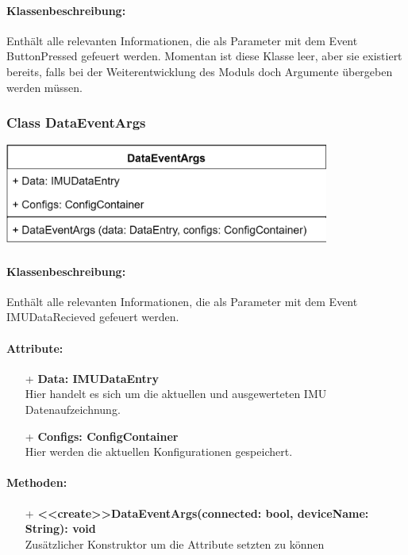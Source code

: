 \documentclass[a4paper,12pt]{article}
\begin{document}
\paragraph{Klassenbeschreibung:}
Enthält alle relevanten Informationen, die als Parameter mit dem Event ButtonPressed gefeuert werden. Momentan ist diese Klasse leer, aber sie existiert bereits, falls bei der Weiterentwicklung des Moduls doch Argumente übergeben werden müssen.



\begin{minipage}[b]{0.5\textwidth}
	\subsubsection{Class DataEventArgs}
	
	\end{minipage}
	\begin{minipage}[c]{0.5\textwidth}
	\includegraphics[width=0.8\textwidth]{bilder/BibPackageKlassen/DataEventArgs.png}
\end{minipage}
\paragraph{Klassenbeschreibung:}
Enthält alle relevanten Informationen, die als Parameter mit dem Event IMUDataRecieved gefeuert werden.

\paragraph{Attribute:}
\begin{itemize}
	\item[+] \textbf{Data: IMUDataEntry}\\Hier handelt es sich um die aktuellen und ausgewerteten IMU Datenaufzeichnung.
	\item[+] \textbf{Configs: ConfigContainer}\\Hier werden die aktuellen Konfigurationen gespeichert.
\end{itemize}

\paragraph{Methoden:}
\begin{itemize}
	\item[+] \textbf{<<create>>DataEventArgs(connected: bool, deviceName: String): void}\\ Zusätzlicher Konstruktor um die Attribute setzten zu können
\end{itemize}
\end{document}
